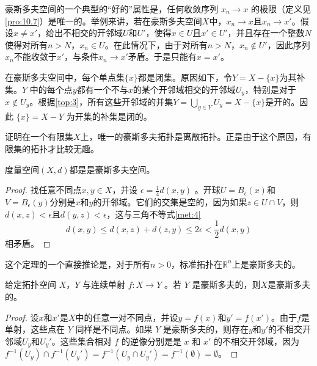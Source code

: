 \begin{theorem}
\begin{theorem}
豪斯多夫空间的一个典型的“好的”属性是，任何收敛序列 $x_{n}\rightarrow x$ 的极限（定义见\ref{pro:10.7}）是唯一的。举例来讲，若在豪斯多夫空间$X$中，$x_{n}\rightarrow x$且$x_{n}\rightarrow x'$。假设$x\neq x'$，给出不相交的开邻域$U$和$U'$，使得$x\in U$且$x'\in U'$，并且存在一个整数$N$使得对所有$n >N$，$x_{n} \in U$。在此情况下，由于对所有$n >N$，$x_{n} \notin U'$，因此序列$x_{n}$不能收敛于$x'$，与条件$x_{n}\rightarrow x'$矛盾。于是只能有$x=x'$。

在豪斯多夫空间中，每个单点集$\{x\}$都是闭集。原因如下，令$Y=X-\{x\}$为其补集。$Y$ 中的每个点$y$都有一个不与$x$的某个开邻域相交的开邻域$U_{y}$，特别是对于$x\notin U_{y}$。根据\ref{top:3}，所有这些开邻域的并集$Y=\bigcup _{y\in Y} U_{y} =X-\{x\}$是开的。因此 $\{x\}=X-Y$ 为开集的补集是闭的。

\begin{exercise}
	证明在一个有限集$X$上，唯一的豪斯多夫拓扑是离散拓扑。正是由于这个原因，有限集的拓扑才比较无趣。
\end{exercise}

\begin{theorem}\label{eg:10.4}
	度量空间$(X,d)$都是是豪斯多夫空间。
\end{theorem}

\begin{proof}
	找任意不同点$x,y\in X$，并设 $\epsilon =\frac{1}{4} d(x,y)$ 。开球$U=B_{\epsilon } (x)$和$V=B_{\epsilon } (y)$分别是$x$和$y$的开邻域。它们的交集是空的，因为如果$z\in U\cap V$，则$d(x,z)< \epsilon $且$d(y,z)< \epsilon $，这与三角不等式\ref{met:4}
\begin{equation*}
d(x,y)\leq d(x,z)+d(z,y)\leq 2\epsilon < \frac{1}{2} d(x,y)
\end{equation*}
相矛盾。
\end{proof}

这个定理的一个直接推论是，对于所有$n >0$，标准拓扑在$\mathbb{R}^{n}$上是豪斯多夫的。

\begin{theorem}\label{eg:10.5}
	给定拓扑空间 $X$，$Y$ 与连续单射 $f:X\rightarrow Y$ 。若 $Y$ 是豪斯多夫的，则$X$是豪斯多夫的。
\end{theorem}

\begin{proof}
	设$x$和$x'$是$X$中的任意一对不同点，并设$y=f(x)$和$y'=f(x')$。由于$f$是单射，这些点在 $Y$ 同样是不同点。如果 $Y$ 是豪斯多夫的，则存在$y$和$y'$的不相交开邻域$U_{y}$和$U_{y} '$。这些集合相对 $f$ 的逆像分别是是 $x$ 和 $x'$ 的不相交开邻域，因为$f^{-1} (U_{y} )\cap f^{-1} (U_{y} ')=f^{-1} (U_{y} \cap U_{y} ')=f^{-1} (\emptyset )=\emptyset $。
\end{proof}


\end{theorem}
\end{theorem}
